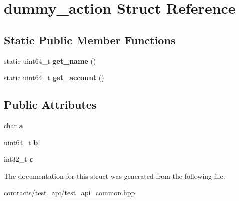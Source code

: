 \hypertarget{structdummy__action}{}\section{dummy\+\_\+action Struct Reference}
\label{structdummy__action}
\subsection*{Static Public Member Functions}
\begin{DoxyCompactItemize}
\item 
\mbox{\label{structdummy__action_a0481301a065d703b9bb04a9f0dc09ad2}} 
static uint64\+\_\+t {\bfseries get\+\_\+name} ()
\item 
\mbox{\label{structdummy__action_a9f53759af266b2cae0fa2259762dea5f}} 
static uint64\+\_\+t {\bfseries get\+\_\+account} ()
\end{DoxyCompactItemize}
\subsection*{Public Attributes}
\begin{DoxyCompactItemize}
\item 
\mbox{\label{structdummy__action_aa306b765c3fe02238b348068e4a004ff}} 
char {\bfseries a}
\item 
\mbox{\label{structdummy__action_a9b90291b60f071726e7129ad4aff8f8f}} 
uint64\+\_\+t {\bfseries b}
\item 
\mbox{\label{structdummy__action_a4c9a879a681cb9fd45fc6c47e3edd3dc}} 
int32\+\_\+t {\bfseries c}
\end{DoxyCompactItemize}


The documentation for this struct was generated from the following file\+:\begin{DoxyCompactItemize}
\item 
contracts/test\+\_\+api/\mbox{\hyperlink{test__api__common_8hpp}{test\+\_\+api\+\_\+common.\+hpp}}\end{DoxyCompactItemize}
